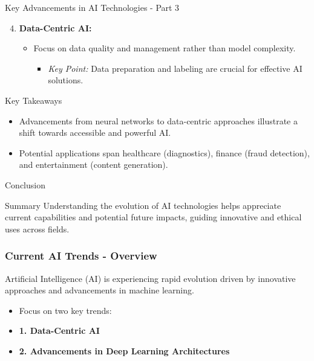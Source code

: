 \documentclass[aspectratio=169]{beamer}
\begin{document}
\begin{frame}[fragile]{Key Advancements in AI Technologies - Part 3}
    \begin{enumerate}
        \setcounter{enumi}{3} %
        \item \textbf{Data-Centric AI:}
            \begin{itemize}
                \item Focus on data quality and management rather than model complexity.
                \begin{itemize}
                    \item \textit{Key Point:} Data preparation and labeling are crucial for effective AI solutions.
                \end{itemize}
            \end{itemize}
    \end{enumerate}
\end{frame}

\begin{frame}[fragile]{Key Takeaways}
    \begin{itemize}
        \item Advancements from neural networks to data-centric approaches illustrate a shift towards accessible and powerful AI.
        \item Potential applications span healthcare (diagnostics), finance (fraud detection), and entertainment (content generation).
    \end{itemize}
\end{frame}

\begin{frame}[fragile]{Conclusion}
    \begin{block}{Summary}
        Understanding the evolution of AI technologies helps appreciate current capabilities and potential future impacts, guiding innovative and ethical uses across fields.
    \end{block}
\end{frame}

\begin{frame}[fragile]
    \frametitle{Current AI Trends - Overview}
    Artificial Intelligence (AI) is experiencing rapid evolution driven by innovative approaches and advancements in machine learning. 
   
    \begin{itemize}
        \item Focus on two key trends: 
        \item \textbf{1. Data-Centric AI}
        \item \textbf{2. Advancements in Deep Learning Architectures}
    \end{itemize}
\end{frame}
\end{document}
